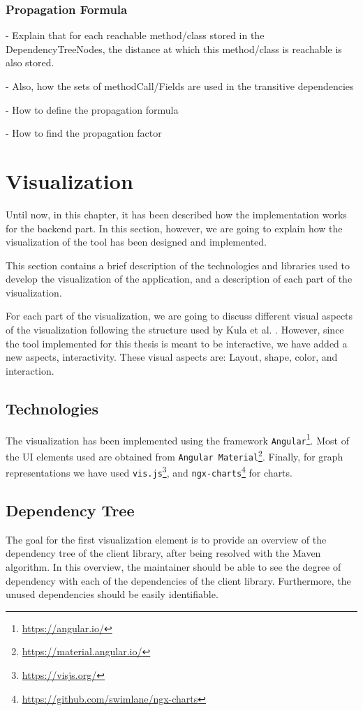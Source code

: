 
\subsubsection{Propagation Formula}
- Explain that for each reachable method/class stored in the DependencyTreeNodes, the distance at which this method/class is reachable is also stored.

- Also, how the sets of methodCall/Fields are used in the transitive dependencies

- How to define the propagation formula

- How to find the propagation factor

\section{Visualization}
Until now, in this chapter, it has been described how the implementation works for the backend part. In this section, however, we are going to explain how the visualization of the tool has been designed and implemented.

This section contains a brief description of the technologies and libraries used to develop the visualization of the application, and a description of each part of the visualization.

For each part of the visualization, we are going to discuss different visual aspects of the visualization following the structure used by Kula et al. \cite{kula2014visualizing}. However, since the tool implemented for this thesis is meant to be interactive, we have added a new aspects, interactivity. These visual aspects are: Layout, shape, color, and interaction.

\subsection{Technologies}
The visualization has been implemented using the framework \texttt{Angular}\footnote{\url{https://angular.io/}}. Most of the UI elements used are obtained from \texttt{Angular Material}\footnote{\url{https://material.angular.io/}}. Finally, for graph representations we have used \texttt{vis.js}\footnote{\url{https://visjs.org/}}, and \texttt{ngx-charts}\footnote{\url{https://github.com/swimlane/ngx-charts}} for charts.

\subsection{Dependency Tree}\label{sec:visualization-dependency-tree}
The goal for the first visualization element is to provide an overview of the dependency tree of the client library, after being resolved with the Maven algorithm. In this overview, the maintainer should be able to see the degree of dependency with each of the dependencies of the client library. Furthermore, the unused dependencies should be easily identifiable. %

